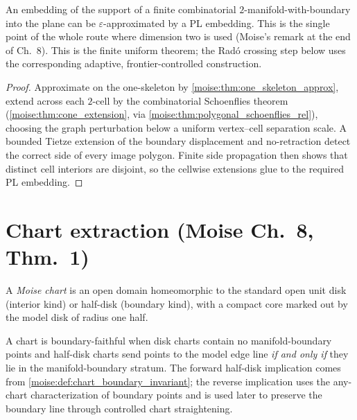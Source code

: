 \begin{theorem}
\label{moise:thm:pl_approximation}
\leanok
{}
An embedding of the support of a finite combinatorial $2$-manifold-with-boundary
into the plane can be $\varepsilon$-approximated by a PL embedding.  This is
the single point of the whole route where dimension two is used (Moise's remark
at the end of Ch.~8).  This is the finite uniform theorem; the Rad\'o crossing
step below uses the corresponding adaptive, frontier-controlled construction.
\end{theorem}

\begin{proof}
\leanok
Approximate on the one-skeleton by \ref{moise:thm:one_skeleton_approx}, extend
across each $2$-cell by the combinatorial Schoenflies theorem
(\ref{moise:thm:cone_extension}, via \ref{moise:thm:polygonal_schoenflies_rel}),
choosing the graph perturbation below a uniform vertex--cell separation scale.
A bounded Tietze extension of the boundary displacement and no-retraction
detect the correct side of every image polygon.  Finite side propagation then
shows that distinct cell interiors are disjoint, so the cellwise extensions
glue to the required PL embedding.
\end{proof}

\section{Chart extraction (Moise Ch.~8, Thm.~1)}

\begin{definition}
\label{moise:def:moise_chart}
\leanok
A \emph{Moise chart} is an open domain homeomorphic to the standard open unit
disk (interior kind) or half-disk (boundary kind), with a compact core marked
out by the model disk of radius one half.
\end{definition}

\begin{definition}
\label{moise:def:boundary_faithful}
\leanok
{}
A chart is boundary-faithful when disk charts contain no manifold-boundary
points and half-disk charts send points to the model edge line \emph{if and
only if} they lie in the manifold-boundary stratum.  The forward half-disk
implication comes from \ref{moise:def:chart_boundary_invariant}; the reverse
implication uses the any-chart characterization of boundary points and is used
later to preserve the boundary line through controlled chart straightening.
\end{definition}

